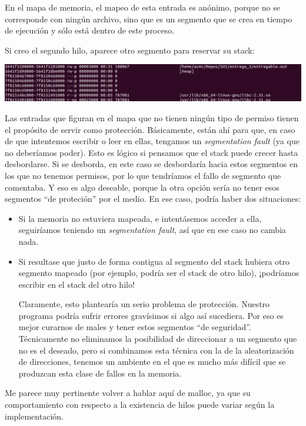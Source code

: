 \documentclass[a4paper]{article}
\begin{document}
En el mapa de memoria, el mapeo de esta entrada es anónimo, porque no se corresponde con ningún archivo, sino que es un segmento que se crea en tiempo de ejecución y sólo está dentro de este proceso.

Si creo el segundo hilo, aparece otro segmento para reservar su stack:

\includegraphics[scale=0.408]{6_hijo2.png}

Las entradas que figuran en el mapa que no tienen ningún tipo de permiso tienen el propósito de servir como protección. Básicamente, están ahí para que, en caso de que intentemos escribir o leer en ellas, tengamos un \emph{segmentation fault} (ya que no deberíamos poder). Esto es lógico si pensamos que el stack puede crecer hasta desbordarse. Si se desborda, en este caso se desbordaría hacia estos segmentos en los que no tenemos permisos, por lo que tendríamos el fallo de segmento que comentaba. Y eso es algo deseable, porque la otra opción sería no tener esos segmentos ``de proteción'' por el medio. En ese caso, podría haber dos situaciones:
\begin{itemize}
    \item Si la memoria no estuviera mapeada, e intentásemos acceder a ella, seguiríamos teniendo un \emph{segmentation fault}, así que en ese caso no cambia nada.
    \item Si resultase que justo de forma contigua al segmento del stack hubiera otro segmento mapeado (por ejemplo, podría ser el stack de otro hilo), ¡podríamos escribir en el stack del otro hilo!
    
    Claramente, esto plantearía un serio problema de protección. Nuestro programa podría sufrir errores gravísimos si algo así sucediera. Por eso es mejor curarnos de males y tener estos segmentos ``de seguridad''. Técnicamente no eliminamos la posibilidad de direccionar a un segmento que no es el deseado, pero si combinamos esta técnica con la de la aleatorización de direcciones, tenemos un ambiente en el que es mucho más difícil que se produzcan esta clase de fallos en la memoria.
\end{itemize}

Me parece muy pertinente volver a hablar aquí de {\ttfamily malloc}, ya que su comportamiento con respecto a la existencia de hilos puede variar según la implementación.
\end{document}
